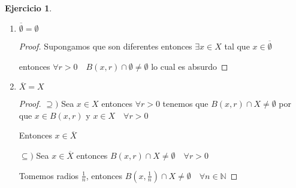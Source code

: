 \documentclass[12pt]{report}
\newcommand{\N}{\mathbb{N}}
\newcommand{\ol}{\overline}
\theoremstyle{definition}
\newtheorem{ej}{Ejercicio}
\begin{document}
\begin{ej}
\begin{enumerate}
\begin{enumerate}
\begin{proof}
	    Como $F = \ol F$ por ser cerrado, entonces $x \notin \ol F$ para algún $F$ en la intersección

	    Entonces $\exists r'>0$ tal que $B(x,r') \cap F = \emptyset$

	    Pero esto es absurdo dado que $A \subseteq F$ tenemos $\emptyset \neq B(x,r') \cap A \subseteq B(x,r') \cap F = \emptyset$

	    Provino de suponer que $x \notin F$ por lo tanto $x \in F $

	    Y esto vale para cualquier $F$ cerrado tal que $A \subseteq F$

	    Entonces $x$ esta en todos estos $F$ y por ende en la intersección

	$\supseteq )$ Supongamos que $x \in \bigcap F$ pero $x \notin \ol A$ entonces tiene que existir un $r>0$ tal que $B(x,r) \cap A = \emptyset$ luego tenemos que $A \subseteq X \setminus B(x,r)$ que ademas es cerrado por que es el complemento de $B(x,r)$ que es abierto

	Pero entonces $X \setminus B(x,r)$ es un cerrado que contiene a $A$ por ende es uno de los $F$ en la intersección

	Entonces $x \in X \setminus B(x,r)$ lo cual es absurdo

	Provino de suponer que existia un $r>0$ tal que $B(x,r) \cap A = \emptyset$

	Entonces $\forall r>0 \quad B(x,r) \cap A \neq \emptyset$ por lo tanto $x \in \ol A$
	  \end{proof}
	\item $\ol \emptyset = \emptyset$
	  \begin{proof}
	    Supongamos que son diferentes entonces $\exists x \in X$ tal que $x \in \ol \emptyset$

	    entonces $\forall r>0 \quad B(x,r) \cap \emptyset \neq \emptyset$ lo cual es absurdo
	  \end{proof}
	\item $\ol X = X$
	  \begin{proof}
		  $\supseteq )$ Sea $x \in X$ entonces $\forall r >0$ tenemos que $ B(x,r) \cap X \neq \emptyset$ por que $x \in B(x,r)$ y $x \in X \quad \forall r >0$

		  Entonces $x \in \ol X$

	$\subseteq ) $ Sea $x \in \ol X$ entonces $B(x,r) \cap X \neq \emptyset \quad \forall r>0$ 

	Tomemos radios $\frac{1}{n}$, entonces $B(x,\frac{1}{n}) \cap X \neq \emptyset \quad \forall n \in \N$


\end{proof}
\end{enumerate}
\end{enumerate}
\end{ej}
\end{document}
